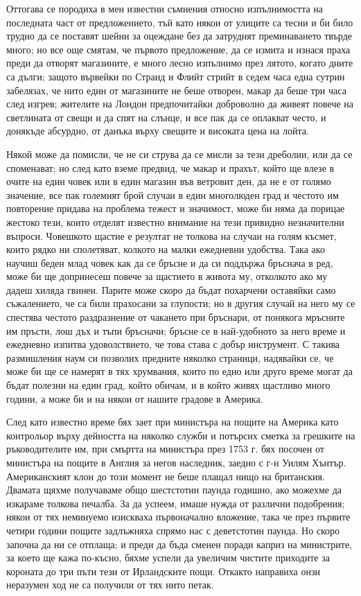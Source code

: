 \documentclass[12pt]{book}
\begin{document}
Оттогава се породиха в мен известни съмнения относно изпълнимостта на последната част от предложението, тъй като някои от улиците са тесни и би било трудно да се поставят шейни за оцеждане без да затруднят преминаването твърде много; но все още смятам, че първото предложение, да се измита и изнася праха преди да отворят магазините, е много лесно изпълнимо през лятото, когато дните са дълги; защото вървейки по Странд и Флийт стрийт в седем часа една сутрин забелязах, че нито един от магазините не беше отворен, макар да беше три часа след изгрев; жителите на Лондон предпочитайки доброволно да живеят повече на светлината от свещи и да спят на слънце, и все пак да се оплакват често, и донякъде абсурдно, от данъка върху свещите и високата цена  на лойта.

Някой може да помисли, че не си струва да се мисли за тези дреболии, или да се споменават; но след като вземе предвид, че макар и прахът, който ще влезе в очите на един човек или в един магазин във ветровит ден, да не е от голямо значение, все пак големият брой случаи в един многолюден град и честото им повторение придава на проблема тежест и значимост, може би няма да порицае жестоко тези, които отделят известно внимание на тези привидно незначителни въпроси. Човешкото щастие е резултат не толкова на случаи на голям късмет, които рядко ни сполетяват, колкото на малки ежедневни удобства. Така ако научиш беден млад човек как да се бръсне и да си поддържа бръснача в ред, може би ще допринесеш повече за щастието в живота му, отколкото ако му дадеш хиляда гвинеи. Парите може скоро да бъдат похарчени оставяйки само съжалението, че са били прахосани за глупости; но в другия случай на него му се спестява честото раздразнение от чакането при бръснари, от понякога мръсните им пръсти, лош дъх и тъпи бръсначи; бръсне се в най-удобното за него време и ежедневно изпитва удоволствието, че това става с добър инструмент. С такива размишления наум си позволих предните няколко страници, надявайки се, че може би ще се намерят в тях хрумвания, които по едно или друго време могат да бъдат полезни на един град, който обичам, и в който живях щастливо много години, а може би и на някои от нашите градове в Америка. 

След като известно време бях зает при министъра на пощите на Америка като контрольор върху дейността на няколко служби и потърсих сметка за грешките на ръководителите им, при смъртта на министъра през 1753 г. бях посочен от министъра на пощите в Англия за негов наследник, заедно с г-н Уилям Хънтър. Американският клон до този момент не беше плащал нищо на британския. Двамата щяхме получаваме общо шестстотин паунда годишно, ако можехме да изкараме толкова печалба. За да успеем, имаше нужда от различни подобрения; някои от тях неминуемо изискваха първоначално вложение, така че през първите четири години пощите задлъжняха спрямо нас с деветстотин паунда. Но скоро започна да ни се отплаща; и преди да бъда сменен поради каприз на министрите, за което ще кажа по-късно, бяхме успели да увеличим чистите приходите за короната до три пъти тези от Ирландските пощи. Откакто направиха онзи неразумен ход не са получили от тях нито петак. 
\end{document}
